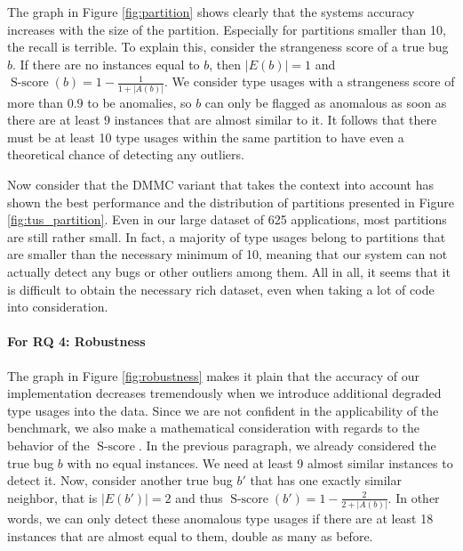 The graph in Figure \ref{fig:partition} shows clearly that the systems accuracy increases with the size of the partition.
Especially for partitions smaller than 10, the recall is terrible.
To explain this, consider the strangeness score of a true bug $b$.
If there are no instances equal to $b$, then $|E(b)|=1$ and $\operatorname{S-score}(b)=1-\frac{1}{1+|A(b)|}$.
We consider type usages with a strangeness score of more than $0.9$ to be anomalies, so $b$ can only be flagged as anomalous as soon as there are at least $9$ instances that are almost similar to it.
It follows that there must be at least 10 type usages within the same partition to have even a theoretical chance of detecting any outliers.

Now consider that the $\text{DMMC}$ variant that takes the context into account has shown the best performance and the distribution of partitions presented in Figure \ref{fig:tus_partition}.
Even in our large dataset of 625 applications, most partitions are still rather small.
In fact, a majority of type usages belong to partitions that are smaller than the necessary minimum of 10, meaning that our system can not actually detect any bugs or other outliers among them.
All in all, it seems that it is difficult to obtain the necessary rich dataset, even when taking a lot of code into consideration.


\paragraph{For RQ 4: Robustness}

The graph in Figure \ref{fig:robustness}  makes it plain that the accuracy of our implementation decreases tremendously when we introduce additional degraded type usages into the data.
Since we are not confident in the applicability of the benchmark, we also make a mathematical consideration with regards to the behavior of the $\operatorname{S-score}$.
In the previous paragraph, we already considered the true bug $b$ with no equal instances.
We need at least 9 almost similar instances to detect it.
Now, consider another true bug $b'$ that has one exactly similar neighbor, that is $|E(b')|=2$ and thus $\operatorname{S-score}(b')=1-\frac{2}{2+|A(b)|}$.
In other words, we can only detect these anomalous type usages if there are at least 18 instances that are almost equal to them, double as many as before.


